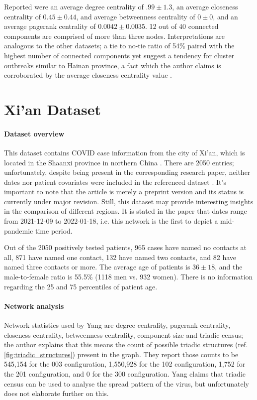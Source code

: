Reported were an average degree centrality of $.99\pm1.3$, an average closeness centrality of $0.45\pm0.44$, and average betweenness centrality of $0\pm0$, and an average pagerank centrality of $0.0042\pm0.0035$. 12 out of 40 connected components are comprised of more than three nodes. Interpretations are analogous to the other datasets; a tie to no-tie ratio of 54\% paired with the highest number of connected components yet suggest a tendency for cluster outbreaks similar to Hainan province, a fact which the author claims is corroborated by the average closeness centrality value \cite{shaanxi_publication}.

\section{Xi'an Dataset}
\label{sec:xian_data}

\paragraph{Dataset overview} This dataset contains COVID case information from the city of Xi'an, which is located in the Shaanxi province in northern China \cite{xian_data}. There are 2050 entries; unfortunately, despite being present in the corresponding research paper, neither dates nor patient covariates were included in the referenced dataset \cite{xian_publication,xian_data}. It's important to note that the article is merely a preprint version and its status is currently under major revision. Still, this dataset may provide interesting insights in the comparison of different regions. It is stated in the paper that dates range from 2021-12-09 to 2022-01-18, i.e. this network is the first to depict a mid-pandemic time period. 

Out of the 2050 positively tested patients, 965 cases have named no contacts at all, 871 have named one contact, 132 have named two contacts, and 82 have named three contacts or more. The average age of patients is $36\pm18$, and the male-to-female ratio is 55.5\% (1118 men vs. 932 women). There is no information regarding the 25 and 75 percentiles of patient age. 

\paragraph{Network analysis} Network statistics used by Yang are degree centrality, pagerank centrality, closeness centrality, betweenness centrality, component size and triadic census; the author explains that this means the count of possible triadic structures (ref. \ref{fig:triadic_structures}) present in the graph. They report those counts to be 545,154 for the 003 configuration, 1,550,928 for the 102 configuration, 1,752 for the 201 configuration, and 0 for the 300 configuration. Yang claims that triadic census can be used to analyse the spread pattern of the virus, but unfortunately does not elaborate further on this.

